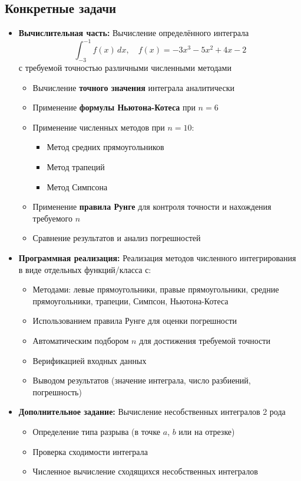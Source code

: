 \documentclass[a4paper,12pt]{article}
\begin{document}
\subsection*{Конкретные задачи}

\begin{itemize}
    \item \textbf{Вычислительная часть:} Вычисление определённого интеграла
    \[
    \int_{-3}^{-1} f(x)\,dx, \quad f(x) = -3x^3 - 5x^2 + 4x - 2
    \]
    с требуемой точностью различными численными методами
    \begin{itemize}
        \item Вычисление \textbf{точного значения} интеграла аналитически
        \item Применение \textbf{формулы Ньютона-Котеса} при $n = 6$
        \item Применение численных методов при $n = 10$:
        \begin{itemize}
            \item Метод средних прямоугольников
            \item Метод трапеций
            \item Метод Симпсона
        \end{itemize}
        \item Применение \textbf{правила Рунге} для контроля точности и нахождения требуемого $n$
        \item Сравнение результатов и анализ погрешностей
    \end{itemize}

    \item \textbf{Программная реализация:} Реализация методов численного интегрирования в виде отдельных функций/класса с:
    \begin{itemize}
        \item Методами: левые прямоугольники, правые прямоугольники, средние прямоугольники, трапеции, Симпсон, Ньютона-Котеса
        \item Использованием правила Рунге для оценки погрешности
        \item Автоматическим подбором $n$ для достижения требуемой точности
        \item Верификацией входных данных
        \item Выводом результатов (значение интеграла, число разбиений, погрешность)
    \end{itemize}

    \item \textbf{Дополнительное задание:} Вычисление несобственных интегралов 2 рода
    \begin{itemize}
        \item Определение типа разрыва (в точке $a$, $b$ или на отрезке)
        \item Проверка сходимости интеграла
        \item Численное вычисление сходящихся несобственных интегралов
    \end{itemize}
\end{itemize}
\end{document}
